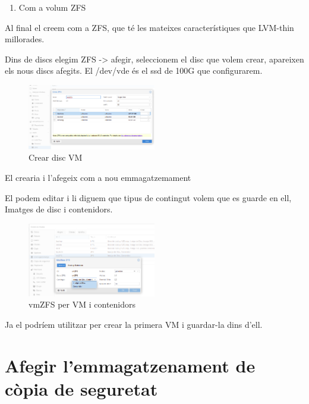 \documentclass[
  10pt,
]{krantz}
\providecommand{\tightlist}{%
  \setlength{\itemsep}{0pt}\setlength{\parskip}{0pt}}
\begin{document}
\begin{enumerate}
\def\labelenumi{\arabic{enumi}.}
\setcounter{enumi}{1}
\tightlist
\item
  Com a volum ZFS
\end{enumerate}

Al final el creem com a ZFS, que té les mateixes característiques que LVM-thin millorades.

Dins de discs elegim ZFS -\textgreater{} afegir, seleccionem el disc que volem crear, apareixen els nous discs afegits. El /dev/vde és el ssd de 100G que configurarem.

\begin{figure}
\centering
\includegraphics[width=0.5\textwidth,height=\textheight]{imatges/proxmox/vmZFS_disc.png}
\caption{Crear disc VM}
\end{figure}

El crearia i l'afegeix com a nou emmagatzemament

El podem editar i li diguem que tipus de contingut volem que es guarde en ell, Imatges de disc i contenidors.

\begin{figure}
\centering
\includegraphics[width=0.5\textwidth,height=\textheight]{imatges/proxmox/ZFS_VM.png}
\caption{vmZFS per VM i contenidors}
\end{figure}

Ja el podríem utilitzar per crear la primera VM i guardar-la dins d'ell.

\hypertarget{afegir-lemmagatzenament-de-cuxf2pia-de-seguretat}{%
\section{Afegir l'emmagatzenament de còpia de seguretat}\label{afegir-lemmagatzenament-de-cuxf2pia-de-seguretat}}
\end{document}
